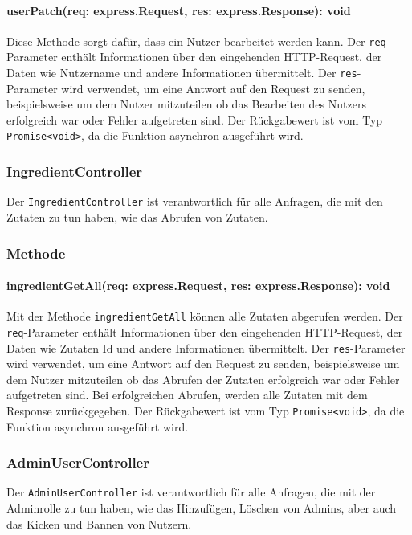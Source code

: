 \documentclass{entwurfsheft}
\begin{document}
\paragraph{userPatch(req: express.Request, res: express.Response): void}
Diese Methode sorgt dafür, dass ein Nutzer bearbeitet werden kann. Der \texttt{req}-Parameter enthält Informationen über den eingehenden HTTP-Request, der Daten wie Nutzername und andere Informationen übermittelt. Der \texttt{res}-Parameter wird verwendet, um eine Antwort auf den Request zu senden, beispielsweise um dem Nutzer mitzuteilen ob das Bearbeiten des Nutzers erfolgreich war oder Fehler aufgetreten sind.
Der Rückgabewert ist vom Typ \texttt{Promise<void>}, da die Funktion asynchron ausgeführt wird.

\subsubsection{IngredientController}\label{sec:IngredientController}
Der \texttt{IngredientController} ist verantwortlich für alle Anfragen, die mit den Zutaten zu tun haben, wie das Abrufen von Zutaten.
\subsubsection*{Methode}
\paragraph{ingredientGetAll(req: express.Request, res: express.Response): void}
Mit der Methode \texttt{ingredientGetAll} können alle Zutaten abgerufen werden. Der \texttt{req}-Parameter enthält Informationen über den eingehenden HTTP-Request, der Daten wie Zutaten Id und andere Informationen übermittelt. Der \texttt{res}-Parameter wird verwendet, um eine Antwort auf den Request zu senden, beispielsweise um dem Nutzer mitzuteilen ob das Abrufen der Zutaten erfolgreich war oder Fehler aufgetreten sind. Bei erfolgreichen Abrufen, werden alle Zutaten mit dem Response zurückgegeben.
Der Rückgabewert ist vom Typ \texttt{Promise<void>}, da die Funktion asynchron ausgeführt wird.

\subsubsection{AdminUserController}\label{sec:AdminUserController}
Der \texttt{AdminUserController} ist verantwortlich für alle Anfragen, die mit der Adminrolle zu tun haben, wie das Hinzufügen, Löschen von Admins, aber auch das Kicken und Bannen von Nutzern.
\end{document}
